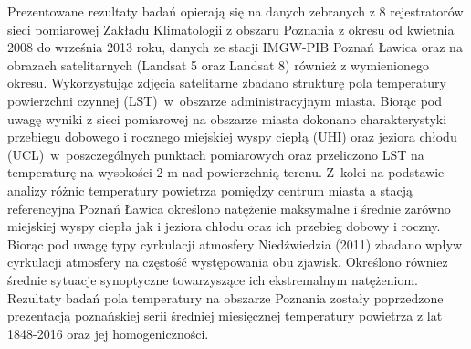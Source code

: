 \documentclass[\main/boa.tex]{subfiles}
\begin{document}
Prezentowane rezultaty badań opierają się na danych zebranych z 8 rejestratorów sieci pomiarowej Zakładu Klimatologii z obszaru Poznania z okresu od kwietnia 2008 do września 2013 roku, danych ze stacji IMGW-PIB Poznań Ławica oraz na obrazach satelitarnych (Landsat 5 oraz Landsat 8) również z wymienionego okresu. Wykorzystując zdjęcia satelitarne zbadano strukturę pola temperatury powierzchni czynnej (LST)~w~obszarze administracyjnym miasta. Biorąc pod uwagę wyniki z sieci pomiarowej na obszarze miasta dokonano charakterystyki przebiegu dobowego i rocznego miejskiej wyspy ciepłą (UHI) oraz jeziora chłodu (UCL)~w~poszczególnych punktach pomiarowych oraz przeliczono LST na temperaturę na wysokości 2 m nad powierzchnią terenu. Z~kolei na podstawie analizy różnic temperatury powietrza pomiędzy centrum miasta a stacją referencyjna Poznań Ławica określono natężenie maksymalne i średnie zarówno miejskiej wyspy ciepła jak i jeziora chłodu oraz ich przebieg dobowy i roczny. Biorąc pod uwagę typy cyrkulacji atmosfery Niedźwiedzia (2011) zbadano wpływ cyrkulacji atmosfery na częstość występowania obu zjawisk. Określono również średnie sytuacje synoptyczne towarzyszące ich ekstremalnym natężeniom. Rezultaty badań pola temperatury na obszarze Poznania zostały poprzedzone prezentacją poznańskiej serii średniej miesięcznej temperatury powietrza z lat 1848-2016 oraz jej homogeniczności. 
\end{document}
